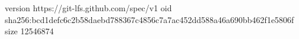 version https://git-lfs.github.com/spec/v1
oid sha256:bcd1defc6c2b58daebd788367c4856c7a7ac452dd588a46a690bb462f1e5806f
size 12546874
